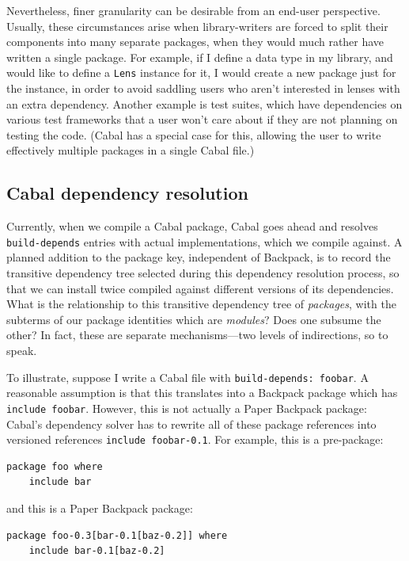 \documentclass{article}
\begin{document}
Nevertheless, finer granularity can be desirable from an end-user perspective.
Usually, these circumstances arise when library-writers are forced to split their
components into many separate packages, when they would much rather have written
a single package.  For example, if I define a data type in my library, and would
like to define a \verb|Lens| instance for it, I would create a new package just
for the instance, in order to avoid saddling users who aren't interested in lenses
with an extra dependency.  Another example is test suites, which have dependencies
on various test frameworks that a user won't care about if they are not planning
on testing the code. (Cabal has a special case for this, allowing the user
to write effectively multiple packages in a single Cabal file.)


\subsection{Cabal dependency resolution}

Currently, when we compile a Cabal
package, Cabal goes ahead and resolves \verb|build-depends| entries with actual
implementations, which we compile against.  A planned addition to the package key,
independent of Backpack, is to record the transitive dependency tree selected
during this dependency resolution process, so that we can install 
twice compiled against different versions of its dependencies.
What is the relationship to this transitive dependency tree of \emph{packages},
with the subterms of our package identities which are \emph{modules}?  Does one
subsume the other?  In fact, these are separate mechanisms---two levels of indirections,
so to speak.

To illustrate, suppose I write a Cabal file with \verb|build-depends: foobar|.  A reasonable assumption is that this translates into a
Backpack package which has \verb|include foobar|.  However, this is not
actually a Paper Backpack package: Cabal's dependency solver has to
rewrite all of these package references into versioned references
\verb|include foobar-0.1|.  For example, this is a pre-package:

\begin{verbatim}
package foo where
    include bar
\end{verbatim}

and this is a Paper Backpack package:

\begin{verbatim}
package foo-0.3[bar-0.1[baz-0.2]] where
    include bar-0.1[baz-0.2]
\end{verbatim}
\end{document}
